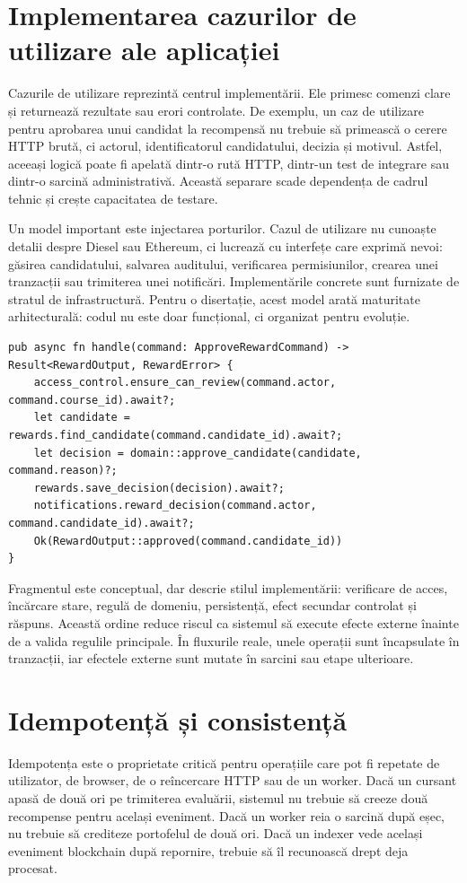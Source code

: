 \section{Implementarea cazurilor de utilizare ale aplicației}
Cazurile de utilizare reprezintă centrul implementării. Ele primesc comenzi clare și returnează rezultate sau erori controlate. De exemplu, un caz de utilizare pentru aprobarea unui candidat la recompensă nu trebuie să primească o cerere HTTP brută, ci actorul, identificatorul candidatului, decizia și motivul. Astfel, aceeași logică poate fi apelată dintr-o rută HTTP, dintr-un test de integrare sau dintr-o sarcină administrativă. Această separare scade dependența de cadrul tehnic și crește capacitatea de testare.

Un model important este injectarea porturilor. Cazul de utilizare nu cunoaște detalii despre Diesel sau Ethereum, ci lucrează cu interfețe care exprimă nevoi: găsirea candidatului, salvarea auditului, verificarea permisiunilor, crearea unei tranzacții sau trimiterea unei notificări. Implementările concrete sunt furnizate de stratul de infrastructură. Pentru o disertație, acest model arată maturitate arhitecturală: codul nu este doar funcțional, ci organizat pentru evoluție.

\begin{lstlisting}[style=cod,caption={Structura conceptuală a unui caz de utilizare.},label={lst:usecase}]
pub async fn handle(command: ApproveRewardCommand) -> Result<RewardOutput, RewardError> {
    access_control.ensure_can_review(command.actor, command.course_id).await?;
    let candidate = rewards.find_candidate(command.candidate_id).await?;
    let decision = domain::approve_candidate(candidate, command.reason)?;
    rewards.save_decision(decision).await?;
    notifications.reward_decision(command.actor, command.candidate_id).await?;
    Ok(RewardOutput::approved(command.candidate_id))
}
\end{lstlisting}

Fragmentul este conceptual, dar descrie stilul implementării: verificare de acces, încărcare stare, regulă de domeniu, persistență, efect secundar controlat și răspuns. Această ordine reduce riscul ca sistemul să execute efecte externe înainte de a valida regulile principale. În fluxurile reale, unele operații sunt încapsulate în tranzacții, iar efectele externe sunt mutate în sarcini sau etape ulterioare.

\section{Idempotență și consistență}
Idempotența este o proprietate critică pentru operațiile care pot fi repetate de utilizator, de browser, de o reîncercare HTTP sau de un worker. Dacă un cursant apasă de două ori pe trimiterea evaluării, sistemul nu trebuie să creeze două recompense pentru același eveniment. Dacă un worker reia o sarcină după eșec, nu trebuie să crediteze portofelul de două ori. Dacă un indexer vede același eveniment blockchain după repornire, trebuie să îl recunoască drept deja procesat.

